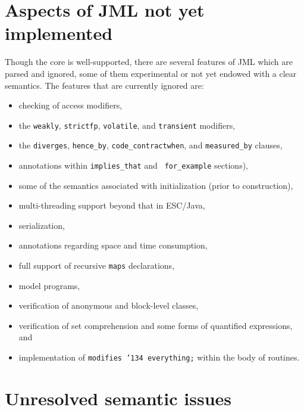 \documentclass{acm_proc_article-sp}
\begin{document}
\section{Aspects of JML not yet implemented}

Though the core is well-supported, there are several features of JML
which are parsed and ignored, some of them experimental or not yet
endowed with a clear semantics.  The features that are currently ignored are:
\setlength{\partopsep}{0in}\setlength{\parskip}{0in}\setlength{\itemsep}{0in}\setlength{\topsep}{0in}
\begin{itemize}
\setlength{\partopsep}{0in}\setlength{\parskip}{0in}\setlength{\itemsep}{0in}\setlength{\topsep}{0in}
\item checking of access modifiers,
\item the \texttt{weakly}, \texttt{strictfp}, \texttt{volatile}, and
  \texttt{transient} modifiers,
\item the \texttt{diverges}, \texttt{hence\_by}, \texttt{code\_contract}\texttt{when}, and
 \texttt{measured\_by} clauses,
\item annotations within \texttt{implies\_that} and {\tt
    for\_example} sections),
\item some of the semantics associated with initialization (prior to
  construction),
\item multi-threading support beyond that in ESC/Java,
\item serialization,
\item annotations regarding space and time consumption,
\item full support of recursive \texttt{maps} declarations,
\item model programs, 
\item verification of anonymous and block-level classes,
\item verification of set comprehension and some forms of quantified
  expressions, and
\item implementation of \texttt{modifies \char'134 everything;} within the body
  of routines.
\end{itemize}


\section{Unresolved semantic issues}
\end{document}
